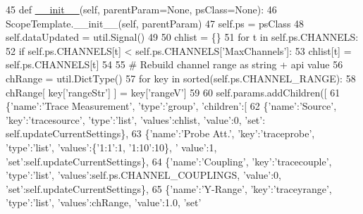 \begin{DoxyCode}
45     \textcolor{keyword}{def }\hyperlink{namespacesoftware_1_1chipwhisperer_1_1capture_1_1scopes_1_1PicoScope_aede6bc8094789e7a9abfcfee603d9b4b}{\_\_init\_\_}(self, parentParam=None, psClass=None):
46         ScopeTemplate.\_\_init\_\_(self, parentParam)
47         self.ps = psClass
48         self.dataUpdated = util.Signal()
49 
50         chlist = \{\}
51         \textcolor{keywordflow}{for} t \textcolor{keywordflow}{in} self.ps.CHANNELS:
52             \textcolor{keywordflow}{if} self.ps.CHANNELS[t] < self.ps.CHANNELS[\textcolor{stringliteral}{'MaxChannels'}]:
53                 chlist[t] = self.ps.CHANNELS[t]
54 
55         \textcolor{comment}{# Rebuild channel range as string + api value}
56         chRange = util.DictType()
57         \textcolor{keywordflow}{for} key \textcolor{keywordflow}{in} sorted(self.ps.CHANNEL\_RANGE):
58             chRange[ key[\textcolor{stringliteral}{'rangeStr'}] ] = key[\textcolor{stringliteral}{'rangeV'}]
59 
60         self.params.addChildren([
61             \{\textcolor{stringliteral}{'name'}:\textcolor{stringliteral}{'Trace Measurement'}, \textcolor{stringliteral}{'type'}:\textcolor{stringliteral}{'group'}, \textcolor{stringliteral}{'children'}:[
62                 \{\textcolor{stringliteral}{'name'}:\textcolor{stringliteral}{'Source'}, \textcolor{stringliteral}{'key'}:\textcolor{stringliteral}{'tracesource'}, \textcolor{stringliteral}{'type'}:\textcolor{stringliteral}{'list'}, \textcolor{stringliteral}{'values'}:chlist, \textcolor{stringliteral}{'value'}:0, \textcolor{stringliteral}{'set'}:
      self.updateCurrentSettings\},
63                 \{\textcolor{stringliteral}{'name'}:\textcolor{stringliteral}{'Probe Att.'}, \textcolor{stringliteral}{'key'}:\textcolor{stringliteral}{'traceprobe'}, \textcolor{stringliteral}{'type'}:\textcolor{stringliteral}{'list'}, \textcolor{stringliteral}{'values'}:\{\textcolor{stringliteral}{'1:1'}:1, \textcolor{stringliteral}{'1:10'}:10\}, \textcolor{stringliteral}{'
      value'}:1, \textcolor{stringliteral}{'set'}:self.updateCurrentSettings\},
64                 \{\textcolor{stringliteral}{'name'}:\textcolor{stringliteral}{'Coupling'}, \textcolor{stringliteral}{'key'}:\textcolor{stringliteral}{'tracecouple'}, \textcolor{stringliteral}{'type'}:\textcolor{stringliteral}{'list'}, \textcolor{stringliteral}{'values'}:self.ps.CHANNEL\_COUPLINGS,
       \textcolor{stringliteral}{'value'}:0, \textcolor{stringliteral}{'set'}:self.updateCurrentSettings\},
65                 \{\textcolor{stringliteral}{'name'}:\textcolor{stringliteral}{'Y-Range'}, \textcolor{stringliteral}{'key'}:\textcolor{stringliteral}{'traceyrange'}, \textcolor{stringliteral}{'type'}:\textcolor{stringliteral}{'list'}, \textcolor{stringliteral}{'values'}:chRange, \textcolor{stringliteral}{'value'}:1.0, \textcolor{stringliteral}{'set'}

\end{DoxyCode}
